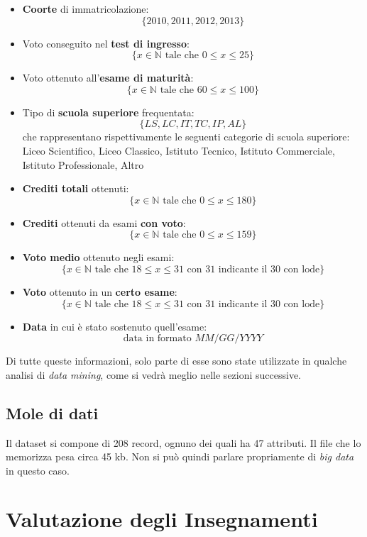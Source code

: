 \begin{itemize}
	\item \textbf{Coorte} di immatricolazione: $$ \{2010, 2011, 2012, 2013\} $$
	\item Voto conseguito nel \textbf{test di ingresso}: $$ \{ x \in \mathbb{N} \text{ tale che } 0 \leq x \leq 25\} $$
	\item Voto ottenuto all'\textbf{esame di maturità}: $$ \{ x \in \mathbb{N} \text{ tale che } 60 \leq x \leq 100\} $$
	\item Tipo di \textbf{scuola superiore} frequentata: $$ \{LS, LC, IT, TC, IP, AL \} $$ che rappresentano rispettivamente le seguenti categorie di scuola superiore: Liceo Scientifico, Liceo Classico, Istituto Tecnico, Istituto Commerciale, Istituto Professionale, Altro
	\item \textbf{Crediti totali} ottenuti: $$ \{ x \in \mathbb{N} \text{ tale che } 0 \leq x \leq 180\} $$
	\item \textbf{Crediti} ottenuti da esami \textbf{con voto}: $$ \{ x \in \mathbb{N} \text{ tale che } 0 \leq x \leq 159\} $$
	\item \textbf{Voto medio} ottenuto negli esami: $$ \{ x \in \mathbb{N} \text{ tale che } 18 \leq x \leq 31 \text { con 31 indicante il 30 con lode}\} $$
	\item \textbf{Voto} ottenuto in un \textbf{certo esame}: $$ \{ x \in \mathbb{N} \text{ tale che } 18 \leq x \leq 31 \text { con 31 indicante il 30 con lode}\} $$
	\item \textbf{Data} in cui è stato sostenuto quell'esame: $$ \text{data in formato }MM/GG/YYYY $$
\end{itemize}

Di tutte queste informazioni, solo parte di esse sono state utilizzate in qualche analisi di \textit{data mining}, come si vedrà meglio nelle sezioni successive.

\subsection{Mole di dati}

Il dataset si compone di 208 record, ognuno dei quali ha 47 attributi. Il file che lo memorizza pesa circa 45 kb. Non si può quindi parlare propriamente di \textit{big data} in questo caso.

\section{Valutazione degli Insegnamenti}

